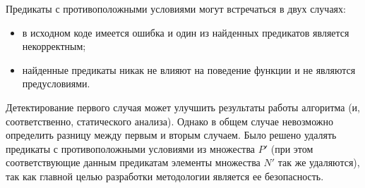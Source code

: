 Предикаты с противоположными условиями могут встречаться в двух случаях:
\begin{itemize}
\item в исходном коде имеется ошибка и один из найденных предикатов является некорректным;
\item найденные предикаты никак не влияют на поведение функции и не являются предусловиями.
\end{itemize}
Детектирование первого случая может улучшить результаты работы алгоритма (и, соответственно, статического анализа). Однако в общем случае невозможно определить разницу между первым и вторым случаем. Было решено удалять предикаты с противоположными условиями из множества $P'$ (при этом соответствующие данным предикатам элементы множества $N'$ так же удаляются), так как главной целью разработки методологии является ее безопасность.

